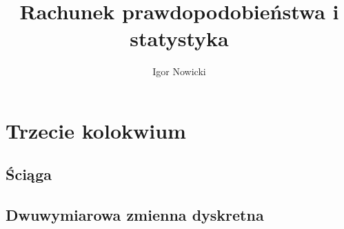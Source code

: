 \documentclass[11pt]{article}
\title{Rachunek prawdopodobieństwa i statystyka}
\author{Igor Nowicki}
\theoremstyle{definition}
\begin{document}
\maketitle
\tableofcontents

\section{Trzecie kolokwium}
\subsection{Ściąga}

\subsection{Dwuwymiarowa zmienna dyskretna}
\end{document}
